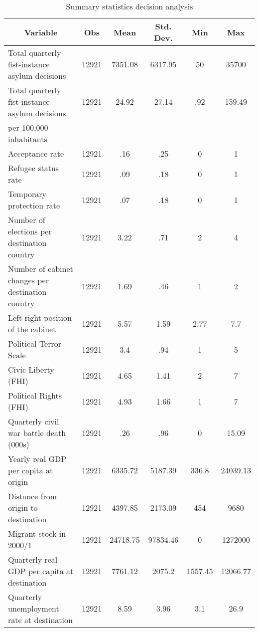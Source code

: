 \begin{table}[!ht] \centering
\footnotesize
 \caption{Summary statistics decision analysis}
\begin{tabular}{l c c c c c }\hline\hline
\multicolumn{1}{c}{Variable} & Obs & Mean & Std. Dev.  & Min & Max  \\ \hline
Total quarterly fist-instance asylum decisions & 12921 & 7351.08 & 6317.95 & 50 & 35700  \\
[0.5em]
Total quarterly fist-instance asylum decisions & 12921 & 24.92 & 27.14 & .92 & 159.49  \\
per 100,000 inhabitants & &  &  &  &   \\
[0.5em]
Acceptance rate & 12921 & .16 & .25 & 0 & 1  \\
[0.5em]
Refugee status rate & 12921 & .09 & .18 & 0 & 1  \\
[0.5em]
Temporary protection rate & 12921 & .07 & .18 & 0 & 1  \\
[0.5em]
Number of elections per destination country & 12921 & 3.22 & .71 & 2 & 4  \\
[0.5em]
Number of cabinet changes per destination country & 12921 & 1.69 & .46 & 1 & 2  \\
[0.5em]
Left-right position of the cabinet & 12921 & 5.57 & 1.59 & 2.77 & 7.7  \\
[0.5em]
Political Terror Scale & 12921 & 3.4 & .94 & 1 & 5  \\
[0.5em]
Civic Liberty (FHI) & 12921 & 4.65 & 1.41 & 2 & 7  \\
[0.5em]
Political Rights (FHI) & 12921 & 4.93 & 1.66 & 1 & 7  \\
[0.5em]
Quarterly civil war battle death (000s) & 12921 & .26 & .96 & 0 & 15.09  \\
[0.5em]
Yearly real GDP per capita at origin & 12921 & 6335.72 & 5187.39 & 336.8 & 24039.13  \\
[0.5em]
Distance from origin to destination & 12921 & 4397.85 & 2173.09 & 454 & 9680  \\
[0.5em]
Migrant stock in 2000/1 & 12921 & 24718.75 & 97834.46 & 0 & 1272000  \\
[0.5em]
Quarterly real GDP per capita at destination & 12921 & 7761.12 & 2075.2 & 1557.45 & 12066.77  \\
[0.5em]
Quarterly unemployment rate at destination & 12921 & 8.59 & 3.96 & 3.1 & 26.9  \\
[0.5em]
\hline\end{tabular}
\end{table}

